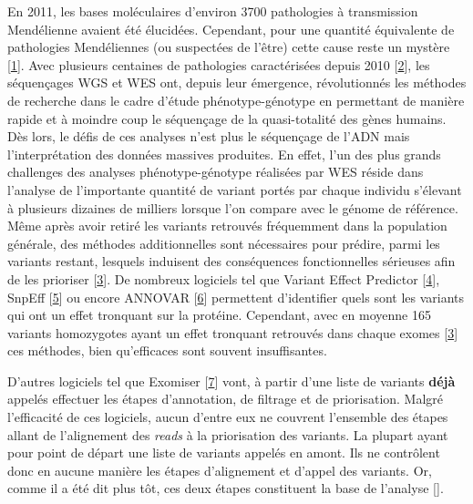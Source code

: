 \documentclass[12pt,twoside]{reedthesis}
\theoremstyle{definition}
\theoremstyle{definition}
\theoremstyle{remark}
\begin{document}
  En 2011, les bases moléculaires d'environ 3700 pathologies à
  transmission Mendélienne avaient été élucidées. Cependant, pour une
  quantité équivalente de pathologies Mendéliennes (ou suspectées de
  l'être) cette cause reste un mystère
  {[}\protect\hyperlink{ref-Amberger2011}{1}{]}. Avec plusieurs centaines
  de pathologies caractérisées depuis 2010
  {[}\protect\hyperlink{ref-Ng}{2}{]}, les séquençages WGS et WES ont,
  depuis leur émergence, révolutionnés les méthodes de recherche dans le
  cadre d'étude phénotype-génotype en permettant de manière rapide et à
  moindre coup le séquençage de la quasi-totalité des gènes humains. Dès
  lors, le défis de ces analyses n'est plus le séquençage de l'ADN mais
  l'interprétation des données massives produites. En effet, l'un des plus
  grands challenges des analyses phénotype-génotype réalisées par WES
  réside dans l'analyse de l'importante quantité de variant portés par
  chaque individu s'élevant à plusieurs dizaines de milliers lorsque l'on
  compare avec le génome de référence. Même après avoir retiré les
  variants retrouvés fréquemment dans la population générale, des méthodes
  additionnelles sont nécessaires pour prédire, parmi les variants
  restant, lesquels induisent des conséquences fonctionnelles sérieuses
  afin de les prioriser {[}\protect\hyperlink{ref-Pelak2010}{3}{]}. De
  nombreux logiciels tel que Variant Effect Predictor
  {[}\protect\hyperlink{ref-McLaren2016}{4}{]}, SnpEff
  {[}\protect\hyperlink{ref-Cingolani2012}{5}{]} ou encore ANNOVAR
  {[}\protect\hyperlink{ref-Wang2010}{6}{]} permettent d'identifier quels
  sont les variants qui ont un effet tronquant sur la protéine. Cependant,
  avec en moyenne 165 variants homozygotes ayant un effet tronquant
  retrouvés dans chaque exomes {[}\protect\hyperlink{ref-Pelak2010}{3}{]}
  ces méthodes, bien qu'efficaces sont souvent insuffisantes.
  
  D'autres logiciels tel que Exomiser
  {[}\protect\hyperlink{ref-Robinson2014}{7}{]} vont, à partir d'une liste
  de variants \textbf{déjà} appelés effectuer les étapes d'annotation, de
  filtrage et de priorisation. Malgré l'efficacité de ces logiciels, aucun
  d'entre eux ne couvrent l'ensemble des étapes allant de l'alignement des
  \emph{reads} à la priorisation des variants. La plupart ayant pour point
  de départ une liste de variants appelés en amont. Ils ne contrôlent donc
  en aucune manière les étapes d'alignement et d'appel des variants. Or,
  comme il a été dit plus tôt, ces deux étapes constituent la base de
  l'analyse {[}{]}.
  
\end{document}
